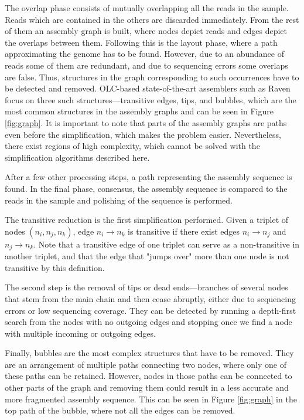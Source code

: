 \documentclass{article}
\begin{document}
The overlap phase consists of mutually overlapping all the reads in the sample. Reads which are contained in the others are discarded immediately. From the rest of them an assembly graph is built, where nodes depict reads and edges depict the overlaps between them. Following this is the layout phase, where a path approximating the genome has to be found.
However, due to an abundance of reads some of them are redundant, and due to sequencing errors some overlaps are false. Thus, structures in the graph corresponding to such occurrences have to be detected and removed. OLC-based state-of-the-art assemblers such as Raven \cite{vaser2020raven} focus on three such structures---transitive edges, tips, and bubbles, which are the most common structures in the assembly graphs and can be seen in Figure \ref{fig:graph}. It is important to note that parts of the assembly graphs are paths even before the simplification, which makes the problem easier. Nevertheless, there exist regions of high complexity, which cannot be solved with the simplification algorithms described here.

After a few other processing steps, a path representing the assembly sequence is found. In the final phase, consensus, the assembly sequence is compared to the reads in the sample and polishing of the  sequence is performed.

The transitive reduction is the first simplification performed. Given a triplet of nodes $(n_i, n_j, n_k)$, edge $n_i \rightarrow n_k$ is transitive if there exist edges $n_i \rightarrow n_j$ and $n_j \rightarrow n_k$. Note that a transitive edge of one triplet can serve as a non-transitive in another triplet, and that the edge that "jumps over" more than one node is not transitive by this definition.

The second step is the removal of tips or dead ends---branches of several nodes that stem from the main chain and then cease abruptly, either due to sequencing errors or low sequencing coverage. They can be detected by running a depth-first search from the nodes with no outgoing edges and stopping once we find a node with multiple incoming or outgoing edges.

Finally, bubbles are the most complex structures that have to be removed. They are an arrangement of multiple paths connecting two nodes, where only one of these paths can be retained. However, nodes in those paths can be connected to other parts of the graph and removing them could result in a less accurate and more fragmented assembly sequence. This can be seen in Figure \ref{fig:graph} in the top path of the bubble, where not all the edges can be removed.
\end{document}

